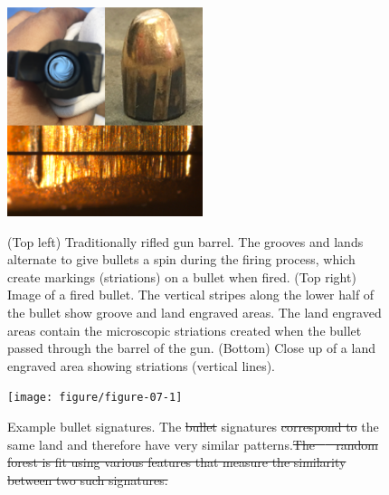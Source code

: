 \documentclass[AMS,STIX2COL]{WileyNJD-v2}\usepackage[]{graphicx}\usepackage[]{color}
\newenvironment{knitrout}{}{} %
\providecommand{\DIFadd}[1]{{\protect\color{blue}\uwave{#1}}} %
\providecommand{\DIFdel}[1]{{\protect\color{red}\sout{#1}}}                      %
\providecommand{\DIFaddFL}[1]{\DIFadd{#1}} %
\providecommand{\DIFdelFL}[1]{\DIFdel{#1}} %
\providecommand{\DIFaddbeginFL}{} %
\providecommand{\DIFaddendFL}{} %
\providecommand{\DIFdelbeginFL}{} %
\providecommand{\DIFdelendFL}{} %
\newcommand{\DIFscaledelfig}{0.5}
\newlength{\DIFdelgraphicswidth} %
\newlength{\DIFdelgraphicsheight} %
\newcommand{\DIFaddincludegraphics}[2][]{{\color{blue}\fbox{\DIFOincludegraphics[#1]{#2}}}} %
\newcommand{\DIFdelincludegraphics}[2][]{%
\sbox{\DIFdelgraphicsbox}{\DIFOincludegraphics[#1]{#2}}%
\settoboxwidth{\DIFdelgraphicswidth}{\DIFdelgraphicsbox} %
\settoboxtotalheight{\DIFdelgraphicsheight}{\DIFdelgraphicsbox} %
\scalebox{\DIFscaledelfig}{%
\parbox[b]{\DIFdelgraphicswidth}{\usebox{\DIFdelgraphicsbox}\\[-\baselineskip] \rule{\DIFdelgraphicswidth}{0em}}\llap{\resizebox{\DIFdelgraphicswidth}{\DIFdelgraphicsheight}{%
\setlength{\unitlength}{\DIFdelgraphicswidth}%
\begin{picture}(1,1)%
\thicklines\linethickness{2pt} %
{\color[rgb]{1,0,0}\put(0,0){\framebox(1,1){}}}%
{\color[rgb]{1,0,0}\put(0,0){\line( 1,1){1}}}%
{\color[rgb]{1,0,0}\put(0,1){\line(1,-1){1}}}%
\end{picture}%
}\hspace*{3pt}}} %
} %
\DeclareRobustCommand{\DIFaddbeginFL}{\DIFOaddbeginFL \let\includegraphics\DIFaddincludegraphics} %
\DeclareRobustCommand{\DIFaddendFL}{\DIFOaddendFL \let\includegraphics\DIFOincludegraphics} %
\DeclareRobustCommand{\DIFdelbeginFL}{\DIFOdelbeginFL \let\includegraphics\DIFdelincludegraphics} %
\DeclareRobustCommand{\DIFdelendFL}{\DIFOaddendFL \let\includegraphics\DIFOincludegraphics} %
\begin{document}
\begin{figure}[!t]
\centering
\begin{knitrout}
\color{fgcolor}

{\centering \DIFdelbeginFL %
\DIFdelendFL \DIFaddbeginFL \includegraphics[width=2.25in]{figure-static/figure-06-1}
\DIFaddendFL

}



\end{knitrout}
\caption{(Top left) Traditionally rifled gun barrel. The grooves and lands alternate to give bullets a spin during the firing process, which create markings (striations) on a bullet when fired. (Top right) Image of a fired bullet. The vertical stripes along the lower half of the bullet show groove and land engraved areas. The land engraved areas contain the microscopic striations created when the bullet passed through the barrel of the gun. (Bottom) Close up of a land engraved area showing striations (vertical lines).}
\DIFdelbeginFL %
\DIFdelendFL \DIFaddbeginFL \label{fig:figure-06}
\DIFaddendFL

\vspace*{\floatsep}

\begin{knitrout}
\color{fgcolor}

{\centering \DIFdelbeginFL %
\DIFdelendFL \DIFaddbeginFL \texttt{[image: figure/figure-07-1]}
\DIFaddendFL

}



\end{knitrout}
\caption{Example bullet signatures. The \DIFdelbeginFL \DIFdelFL{bullet }\DIFdelendFL signatures \DIFdelbeginFL \DIFdelFL{correspond to }\DIFdelendFL \DIFaddbeginFL \DIFaddFL{are from }\DIFaddendFL the same land and therefore have very similar patterns.\DIFdelbeginFL \DIFdelFL{The \mbox{%
\citet{hare:2017} }\hspace{0pt}%
random forest is fit using various features that measure the similarity between two such signatures.}\DIFdelendFL }
\DIFdelbeginFL %
\DIFdelendFL \DIFaddbeginFL \label{fig:figure-07}
\DIFaddendFL \end{figure}
\end{document}
